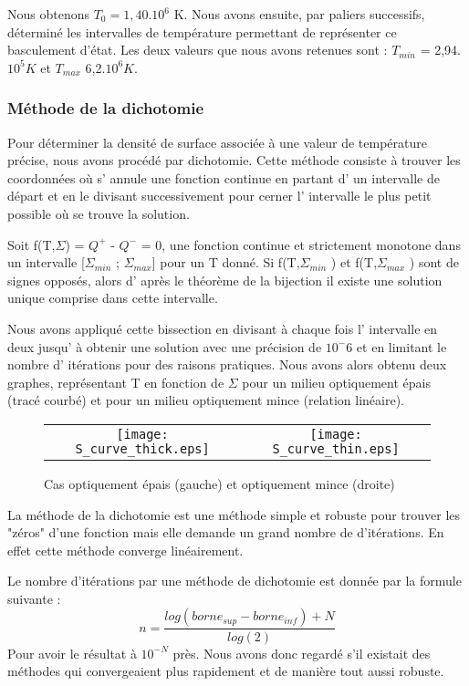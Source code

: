 Nous obtenons $T_0 =1,40.10^6$ K. Nous avons ensuite, par paliers successifs, déterminé les intervalles de température permettant de représenter ce basculement d'état. Les deux valeurs que nous avons retenues sont : $T_{min}$ = 2,94.$10^5 K$ et $T_{max}$ 6,2.$10^6 K$. 


\subsubsection{Méthode de la dichotomie}

Pour déterminer la densité de surface associée à une valeur de température précise, nous avons procédé par dichotomie.
Cette méthode consiste à trouver les coordonnées où s' annule une fonction continue en partant d' un intervalle de départ et en le divisant successivement pour cerner l' intervalle le plus petit possible où se trouve la solution.  

Soit f(T,$\Sigma$) = $Q^+$ - $Q^-$ = 0,  une fonction continue et strictement monotone dans un intervalle [$\Sigma_{min}$ ; $\Sigma_{max}$] pour un T donné. Si f(T,$\Sigma_{min}$ ) et  f(T,$\Sigma_{max}$ ) sont de signes opposés, alors d' après le théorème de la bijection il existe une solution unique comprise dans cette intervalle. 

Nous avons appliqué cette bissection en divisant à chaque fois l' intervalle en deux jusqu' à obtenir une solution avec une précision de $10^-6$ et en limitant le nombre d' itérations pour des raisons pratiques. Nous avons alors obtenu deux graphes, représentant T en fonction de $\Sigma$ pour un milieu optiquement épais (tracé courbé) et pour un milieu optiquement mince (relation linéaire).


\begin{figure}[htb!]
\centering
\begin{tabular}{cc} 
\texttt{[image: S\_curve\_thick.eps]} &
\texttt{[image: S\_curve\_thin.eps]} \\
\end{tabular}
  \caption{Cas optiquement épais (gauche) et optiquement mince (droite)}
\label{Fig::}
\end{figure}

La méthode de la dichotomie est une méthode simple et robuste pour trouver les "zéros" d'une fonction mais elle demande un grand nombre de d'itérations. En effet cette méthode converge linéairement.

Le nombre d'itérations par une méthode de dichotomie est donnée par la formule suivante : 
\begin{equation}
n = \frac{log(borne_{sup} - borne_{inf}) + N}{log(2)} 
\end{equation}
Pour avoir le résultat à $10^{-N}$ près.
Nous avons donc regardé s'il existait des méthodes qui convergeaient plus rapidement et de manière tout aussi robuste. 

